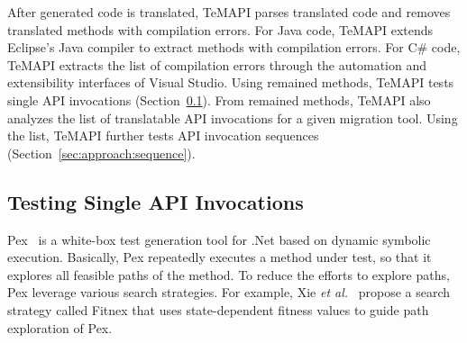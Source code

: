 After generated code is translated, TeMAPI parses translated code and removes translated methods with compilation errors. For Java code, TeMAPI extends Eclipse's Java compiler to extract methods with compilation errors. For C\# code, TeMAPI extracts the list of compilation errors through the automation and extensibility interfaces of Visual Studio. Using remained methods, TeMAPI tests single API invocations (Section~\ref{sec:approach:single}). From remained methods, TeMAPI also analyzes the list of translatable API invocations for a given migration tool. Using the list, TeMAPI further tests API invocation sequences (Section~\ref{sec:approach:sequence}).


%


\subsection{Testing Single API Invocations}
\label{sec:approach:single}

Pex~\cite{tillmann2008pex} is a white-box test generation tool for .Net based on dynamic symbolic execution. Basically, Pex repeatedly executes a method under test, so that it explores all feasible paths of the method. To reduce the efforts to explore paths, Pex leverage various search strategies. For example, Xie \emph{et al.}~\cite{xie09:fitness} propose a search strategy called Fitnex that uses state-dependent fitness values to guide path exploration of Pex.

